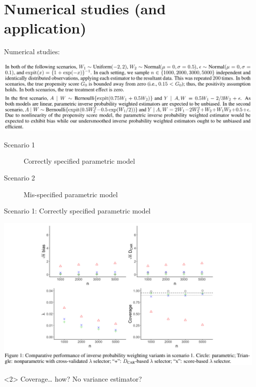 \documentclass[smaller]{beamer}\usepackage{listings}
\begin{document}
\section{Numerical studies (and application)}
\label{sec:org0c7d9e6}
\begin{frame}[label={sec:org84cb2a9}]{Numerical studies:}
\begin{center}
\includegraphics[width=1\textwidth]{./screenshots/numerical-results.png}
\end{center}

\begin{description}
\item[{Scenario 1}] Correctly specified parametric model
\item[{Scenario 2}] Mis-specified parametric model
\end{description}
\end{frame}

\begin{frame}[label={sec:org3a8cc58}]{Scenario 1: Correctly specified parametric model}
\begin{center}
\includegraphics[width=1\textwidth]{./screenshots/scenario1.png}
\end{center}

\begin{block}<2>{\color{red} Coverage\ldots{} how?}
No variance estimator?
\end{block}
\end{frame}
\end{document}
